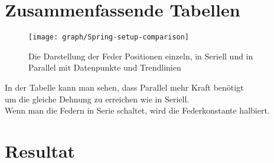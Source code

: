 \documentclass[../main.tex]{subfiles} %
\begin{document}
\section{Zusammenfassende Tabellen}\label{sec:zusammenfassende-tabellen}
    \begin{figure}[H]
        \centering
        \texttt{[image: graph/Spring-setup-comparison]}
        \caption{Die Darstellung der Feder Positionen einzeln, in Seriell und in Parallel mit Datenpunkte und Trendlinien}\label{fig:figure}
    \end{figure}
    In der Tabelle kann man sehen, dass Parallel mehr Kraft benötigt \\
    um die gleiche Dehnung zu erreichen wie in Seriell.\\ 
    Wenn man die Federn in Serie schaltet, wird die Federkonstante halbiert.
    \section{Resultat}\label{subsec:resultat}
\end{document}
